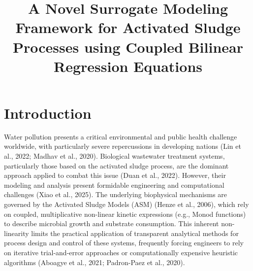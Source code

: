 \documentclass{article}
\begin{document}
\title{A Novel Surrogate Modeling Framework for Activated Sludge Processes using Coupled Bilinear Regression Equations}

\maketitle

\section{Introduction}

Water pollution presents a critical environmental and public health challenge worldwide, with particularly severe repercussions in developing nations (Lin et al., 2022; Madhav et al., 2020). Biological wastewater treatment systems, particularly those based on the activated sludge process, are the dominant approach applied to combat this issue (Duan et al., 2022). However, their modeling and analysis present formidable engineering and computational challenges (Xiao et al., 2025). The underlying biophysical mechanisms are governed by the Activated Sludge Models (ASM) (Henze et al., 2006), which rely on coupled, multiplicative non-linear kinetic expressions (e.g., Monod functions) to describe microbial growth and substrate consumption. This inherent non-linearity limits the practical application of transparent analytical methods for process design and control of these systems, frequently forcing engineers to rely on iterative trial-and-error approaches or computationally expensive heuristic algorithms (Aboagye et al., 2021; Padron-Paez et al., 2020).
\end{document}
